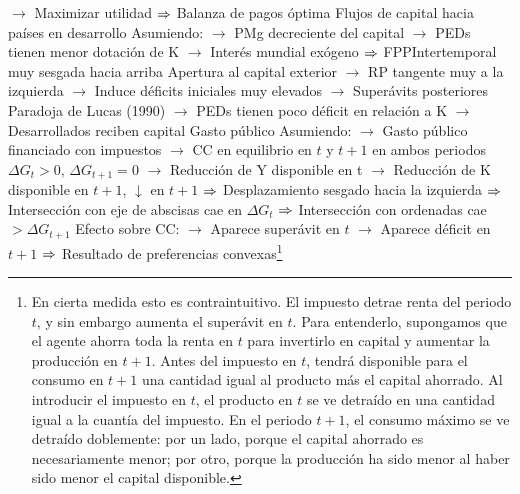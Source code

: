\documentclass{nuevotema}
\begin{document}
\begin{esquemal}
				\4[] $\to$ Maximizar utilidad
				\4[] $\Rightarrow$ Balanza de pagos óptima
				\4[] 
				\4 Flujos de capital hacia países en desarrollo
				\4[] Asumiendo:
				\4[] $\to$ PMg decreciente del capital
				\4[] $\to$ PEDs tienen menor dotación de K
				\4[] $\to$ Interés mundial exógeno
				\4[] $\Rightarrow$ FPPIntertemporal muy sesgada hacia arriba
				\4[] Apertura al capital exterior
				\4[] $\to$ RP tangente muy a la izquierda
				\4[] $\to$ Induce déficits iniciales muy elevados
				\4[] $\to$ Superávits posteriores
				\4[] Paradoja de Lucas (1990)
				\4[] $\to$ PEDs tienen poco déficit en relación a K
				\4[] $\to$ Desarrollados reciben capital
				\4 Gasto público
				\4[] Asumiendo:
				\4[] $\to$ Gasto público financiado con impuestos
				\4[] $\to$ CC en equilibrio en $t$ y $t+1$ en ambos periodos
				\4[] $\Delta G_t > 0$, $\Delta G_{t+1} =0$
				\4[] $\to$ Reducción de Y disponible en t
				\4[] $\to$ Reducción de K disponible en $t+1$, $\downarrow$ en $t+1$
				\4[] $\Rightarrow$ Desplazamiento sesgado hacia la izquierda
				\4[] $\Rightarrow$ Intersección con eje de abscisas cae en $\Delta G_t$
				\4[] $\Rightarrow$ Intersección con ordenadas cae $> \Delta G_{t+1}$
				\4[] Efecto sobre CC:
				\4[] $\to$ Aparece superávit en $t$
				\4[] $\to$ Aparece déficit en $t+1$
				\4[] $\Rightarrow$ Resultado de preferencias convexas\footnote{En cierta medida esto es contraintuitivo. El impuesto detrae renta del periodo $t$, y sin embargo aumenta el superávit en $t$. Para entenderlo, supongamos que el agente ahorra toda la renta en $t$ para invertirlo en capital y aumentar la producción en $t+1$. Antes del impuesto en $t$, tendrá disponible para el consumo en $t+1$ una cantidad igual al producto más el capital ahorrado. Al introducir el impuesto en $t$, el producto en $t$ se ve detraído en una cantidad igual a la cuantía del impuesto. En el periodo $t+1$, el consumo máximo se ve detraído doblemente: por un lado, porque el capital ahorrado es necesariamente menor; por otro, porque la producción ha sido menor al haber sido menor el capital disponible.
				
}
\end{esquemal}
\end{document}
